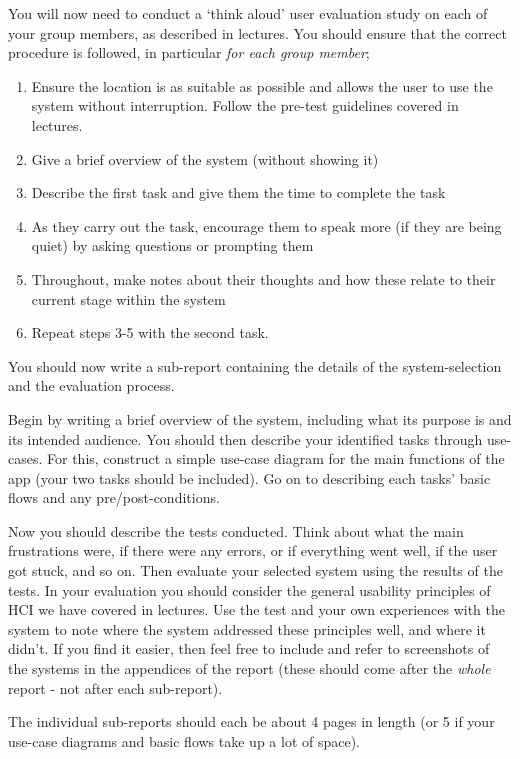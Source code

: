 \documentclass[11pt,a4paper]{report}
\begin{document}
You will now need to conduct a `think aloud' user evaluation study on each of your group members, as described in lectures. You should ensure that the correct procedure is followed, in particular \textit{for each group member};
\begin{enumerate}
    \item Ensure the location is as suitable as possible and allows the user to use the system without interruption. Follow the pre-test guidelines covered in lectures.
    \item Give a brief overview of the system (without showing it)
    \item Describe the first task and give them the time to complete the task
    \item As they carry out the task, encourage them to speak more (if they are being quiet) by asking questions or prompting them
    \item Throughout, make notes about their thoughts and how these relate to their current stage within the system
    \item Repeat steps 3-5 with the second task.
\end{enumerate}
You should now write a sub-report containing the details of the system-selection and the evaluation process.

Begin by writing a brief overview of the system, including what its purpose is and its intended audience. You should then describe your identified tasks through use-cases. For this, construct a simple use-case diagram for the main functions of the app (your two tasks should be included). Go on to describing each tasks' basic flows and any pre/post-conditions.  

Now you should describe the tests conducted. Think about what the main frustrations were, if there were any errors, or if everything went well, if the user got stuck, and so on. Then evaluate your selected system using the results of the tests.  In your evaluation you should consider the general usability principles of HCI we have covered in lectures. Use the test and your own experiences with the system to note where the system addressed these principles well, and where it didn't. If you find it easier, then feel free to include and refer to screenshots of the systems in the appendices of the report (these should come after the \textit{whole} report - not after each sub-report).

The individual sub-reports should each be about 4 pages in length (or 5 if your use-case diagrams and basic flows take up a lot of space).
\end{document}
